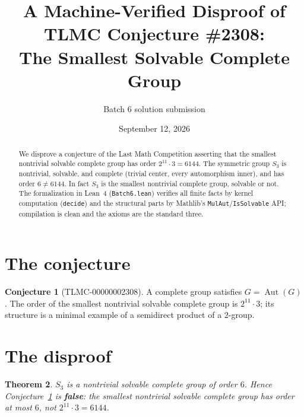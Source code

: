 \documentclass[11pt]{article}
\title{A Machine-Verified Disproof of TLMC Conjecture \#2308:\\ The Smallest Solvable Complete Group}
\author{Batch 6 solution submission}
\date{September 12, 2026}
\newtheorem{theorem}{Theorem}[section]
\theoremstyle{definition}
\newtheorem{conjecture}[theorem]{Conjecture}
\theoremstyle{remark}
\begin{document}
\maketitle

\begin{abstract}
We disprove a conjecture of the Last Math Competition asserting that the smallest nontrivial solvable complete group has order $2^{11} \cdot 3 = 6144$. The symmetric group $S_3$ is nontrivial, solvable, and complete (trivial center, every automorphism inner), and has order $6 \ne 6144$. In fact $S_3$ is the smallest nontrivial complete group, solvable or not. The formalization in Lean~4 (\texttt{Batch6.lean}) verifies all finite facts by kernel computation (\texttt{decide}) and the structural parts by Mathlib's \texttt{MulAut}/\texttt{IsSolvable} API; compilation is clean and the axioms are the standard three.
\end{abstract}

\section{The conjecture}

\begin{conjecture}[TLMC-00000002308]\label{conj:2308}
A complete group satisfies $G = \operatorname{Aut}(G)$. The order of the smallest nontrivial solvable complete group is $2^{11}\cdot 3$; its structure is a minimal example of a semidirect product of a $2$-group.
\end{conjecture}

\section{The disproof}

\begin{theorem}\label{thm:2308}
$S_3$ is a nontrivial solvable complete group of order $6$. Hence Conjecture~\ref{conj:2308} is \textbf{false}: the smallest nontrivial solvable complete group has order at most $6$, not $2^{11} \cdot 3 = 6144$.
\end{theorem}
\end{document}
